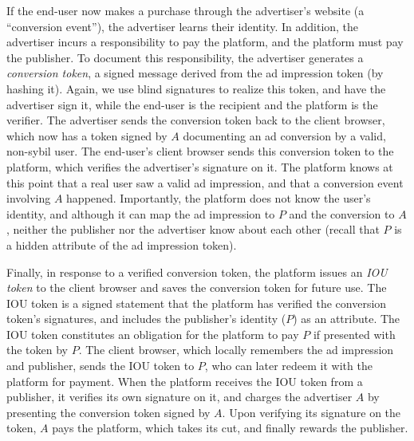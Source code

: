 %
If the end-user now makes a purchase through the advertiser's website (a ``conversion event''), the advertiser learns their identity.
%
In addition, the advertiser incurs a responsibility to pay the platform, and the platform must pay the publisher.
%
To document this responsibility, the advertiser generates a \emph{conversion token}, a signed message derived from the ad impression token (\eg by hashing it).
%
Again, we use blind signatures to realize this token, and have the advertiser sign it, while the end-user is the recipient and the platform is the verifier.
%
The advertiser sends the conversion token back to the client browser, which now has a token signed by $A$ documenting an ad conversion by a valid, non-sybil user.
%
The end-user's client browser sends this conversion token to the platform, which verifies the advertiser's signature on it.
%
The platform knows at this point that a real user saw a valid ad impression, and that a conversion event involving $A$ happened.
%
Importantly, the platform does not know the user's identity, and although it can map the ad impression to $P$ and the conversion to $A$, neither the publisher nor the advertiser know about each other (recall that $P$ is a hidden attribute of the ad impression token).
%

%
Finally, in response to a verified conversion token, the platform issues an \emph{IOU token} to the client browser and saves the conversion token for future use.
%
The IOU token is a signed statement that the platform has verified the conversion token's signatures, and includes the publisher's identity ($P$) as an attribute.
%
The IOU token constitutes an obligation for the platform to pay $P$ if presented with the token by $P$.
%
The client browser, which locally remembers the ad impression and publisher, sends the IOU token to $P$, who can later redeem it with the platform for payment.
%
When the platform receives the IOU token from a publisher, it verifies its own signature on it, and charges the advertiser $A$ by presenting the conversion token signed by $A$.
%
Upon verifying its signature on the token, $A$ pays the platform, which takes its cut, and finally rewards the publisher.
%

